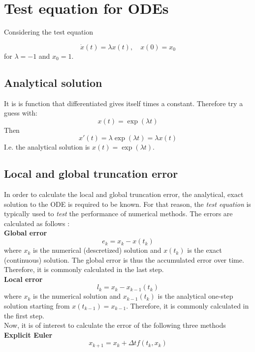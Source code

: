 \section{Test equation for ODEs}
Considering the test equation

$$
\dot{x}(t)=\lambda x(t), \quad x(0)=x_{0} \label{eq:test}
$$
for $\lambda=-1$ and $x_{0}=1$.

\subsection{Analytical solution}
It is is function that differentiated gives itself times a constant. Therefore try a guess with:
$$
x(t) = \exp(\lambda t)
$$
Then
$$
x'(t) = \lambda \exp(\lambda t) = \lambda x(t)
$$
I.e. the analytical solution is $x(t) = \exp(\lambda t)$.

\subsection{Local and global truncation error}
In order to calculate the local and global truncation error, the analytical, exact solution to the ODE is required to be known. For that reason, the \textit{test equation} is typically used to \textit{test} the performance of numerical methods. The errors are calculated as follows \cite{JrgensenScientificEquations}:
\\

\textbf{Global error}
$$
e_{k}=x_{k}-x\left(t_{k}\right)
$$
where $x_{k}$ is the numerical (descretized) solution and $x\left(t_{k}\right)$ is the exact (continuous) solution. The global error is thus the accumulated error over time. Therefore, it is commonly calculated in the last step.
\\

\textbf{Local error}
$$
l_{k}=x_{k}-x_{k-1}\left(t_{k}\right)
$$
where $x_{k}$ is the numerical solution and $x_{k-1}\left(t_{k}\right)$ is the analytical one-step solution starting from $x\left(t_{k-1}\right)=x_{k-1}$. Therefore, it is commonly calculated in the first step.
\\

Now, it is of interest to calculate the error of the following three methods
\\

\textbf{Explicit Euler \cite{JrgensenScientificEquationsb}}
\begin{equation}
    x_{k+1}=x_{k}+\Delta t f\left(t_{k}, x_{k}\right)
\end{equation}


